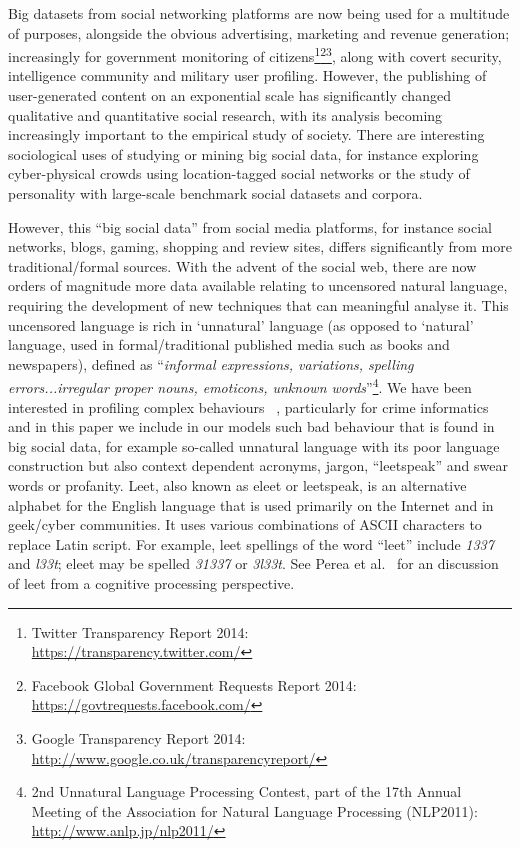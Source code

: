 \documentclass{AISB2008}
\begin{document}
Big datasets from social networking platforms are now being used for a
multitude of purposes, alongside the obvious advertising, marketing
and revenue generation; increasingly for government monitoring of
citizens\footnote{Twitter Transparency Report 2014:\\
\url{https://transparency.twitter.com/}}\footnote{Facebook Global
Government Requests Report
2014:\\\url{https://govtrequests.facebook.com/}}\footnote{Google
Transparency Report
2014:\\\url{http://www.google.co.uk/transparencyreport/}}, along with
covert security, intelligence community and military user profiling.
However, the publishing of user-generated content on an exponential
scale has significantly changed qualitative and quantitative social
research, with its analysis becoming increasingly important to the
empirical study of society. There are interesting sociological uses of
studying or mining big social data, for instance exploring
cyber-physical crowds using location-tagged social networks or the
study of personality with large-scale benchmark social datasets and
corpora.

However, this ``big social data'' from social media platforms, for
instance social networks, blogs, gaming, shopping and review sites,
differs significantly from more traditional/formal sources.  With the
advent of the social web, there are now orders of magnitude more data
available relating to uncensored natural language, requiring the
development of new techniques that can meaningful analyse it. This
uncensored language is rich in `unnatural' language (as opposed to
`natural' language, used in formal/traditional published media such as
books and newspapers), defined as ``{\emph{informal expressions,
variations, spelling errors...irregular proper nouns, emoticons,
unknown words}}''\footnote{2nd Unnatural Language Processing Contest,
part of the 17th Annual Meeting of the Association for Natural
Language Processing (NLP2011): \url{http://www.anlp.jp/nlp2011/}}.  We
have been interested in profiling complex behaviours
~\cite{oatley+crick:2014}, particularly for crime
informatics~\cite{oatley+crick_asonam2014,oatley+crick_fosintsi2014}
and in this paper we include in our models such bad behaviour that is
found in big social data, for example so-called unnatural language
with its poor language construction but also context dependent
acronyms, jargon, ``leetspeak'' and swear words or profanity.  Leet,
also known as eleet or leetspeak, is an alternative alphabet for the
English language that is used primarily on the Internet and in
geek/cyber communities. It uses various combinations of ASCII
characters to replace Latin script. For example, leet spellings of the
word ``leet'' include {\emph{1337}} and {\emph{l33t}}; eleet may be
spelled {\emph{31337}} or {\emph{3l33t}}. See Perea et
al.~\cite{perea-et-al:2008} for an discussion of leet from a cognitive
processing perspective.
\end{document}
